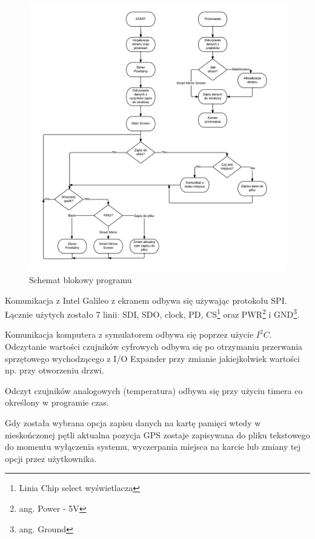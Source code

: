 \documentclass{xmgr}
\begin{document}
\begin{figure}[!hp]
    \centering
    	\includegraphics[height=0.7\textheight]{images/codeDiagram.png}
    \caption{Schemat blokowy programu}
\end{figure}

Komunikacja z Intel Galileo z ekranem odbywa się używając protokołu SPI. Łącznie użytych zostało 7 linii: SDI, SDO, clock, PD, CS\footnote{Linia Chip select wyświetlacza} oraz PWR\footnote{ang. Power - 5V} i GND\footnote{ang. Ground}. 

Komunikacja komputera z symulatorem odbywa się poprzez użycie $I^2C$. Odczytanie wartości czujników cyfrowych odbywa się po otrzymaniu przerwania sprzętowego wychodzącego z I/O Expander przy zmianie jakiejkolwiek wartości np. przy otworzeniu drzwi. 

Odczyt czujników analogowych (temperatura) odbywa się przy użyciu timera co określony w programie czas. 

Gdy została wybrana opcja zapisu danych na kartę pamięci wtedy w nieskończonej pętli aktualna pozycja GPS zostaje zapisywana do pliku tekstowego do momentu wyłączenia systemu, wyczerpania miejsca na karcie lub zmiany tej opcji przez użytkownika.
\end{document}
